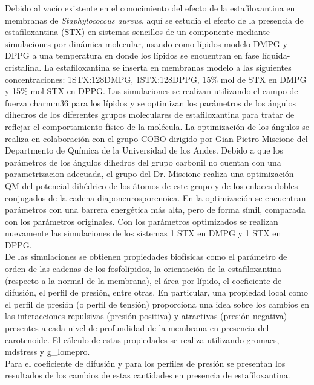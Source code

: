 \documentclass[12pt]{article}
\begin{document}
Debido al vac\'{i}o existente en el conocimiento del efecto de la estafiloxantina en membranas de \textit{Staphylococcus aureus}, aqu\'{i} se estudia el efecto de la presencia de estafiloxantina (STX) en sistemas sencillos de un componente mediante simulaciones por din\'{a}mica molecular, usando como l\'{i}pidos modelo DMPG y DPPG a una temperatura en donde los l\'{i}pidos se encuentran en fase l\'{i}quida-cristalina. La estafiloxantina se inserta en membranas modelo a las siguientes concentraciones: 1STX:128DMPG, 1STX:128DPPG, 15\% mol de STX en DMPG y 15\% mol STX en DPPG. Las simulaciones se realizan utilizando el campo de fuerza charmm36 para los l\'{i}pidos y se optimizan los par\'{a}metros de los \'{a}ngulos dihedros de los diferentes grupos moleculares de estafiloxantina para tratar de reflejar el comportamiento f\'{i}sico de la mol\'{e}cula. La optimizaci\'{o}n de los \'{a}ngulos se realiza en colaboraci\'{o}n con el grupo COBO dirigido por Gian Pietro Miscione del Departmento de Qu\'{i}mica de la Universidad de los Andes. Debido a que los par\'{a}metros de los \'{a}ngulos dihedros del grupo carbonil no cuentan con una parametrizacion adecuada, el grupo del Dr. Miscione realiza una optimizaci\'{o}n QM del potencial dih\'{e}drico de los \'{a}tomos de este grupo y de los enlaces dobles conjugados de la cadena diaponeurosporenoica. En la optimizaci\'{o}n se encuentran par\'{a}metros con una barrera energ\'{e}tica m\'{a}s alta, pero de forma s\'{i}mil, comparada con los par\'{a}metros originales. Con los par\'{a}metros optimizados se realizan nuevamente las simulaciones de los sistemas 1 STX en DMPG y 1 STX en DPPG.\\
De las simulaciones se obtienen propiedades biof\'{i}sicas como el par\'{a}metro de orden de las cadenas de los fosfol\'{i}pidos, la orientaci\'{o}n de la estafiloxantina (respecto a la normal de la membrana), el \'{a}rea por l\'{i}pido, el coeficiente de difusi\'{o}n, el perfil de presi\'{o}n, entre otras. En particular, una propiedad local como el perfil de presi\'{o}n (o perfil de tensi\'{o}n) proporciona una idea sobre los cambios en las interacciones repulsivas (presi\'{o}n positiva) y atractivas (presi\'{o}n negativa) presentes a cada nivel de profundidad de la membrana en presencia del carotenoide. 
El c\'{a}lculo de estas propiedades se realiza utilizando gromacs, mdstress y g\_lomepro.\\
Para el coeficiente de difusi\'{o}n y para los perfiles de presi\'{o}n se presentan los resultados de los cambios de estas cantidades en presencia de estafiloxantina.
\end{document}
